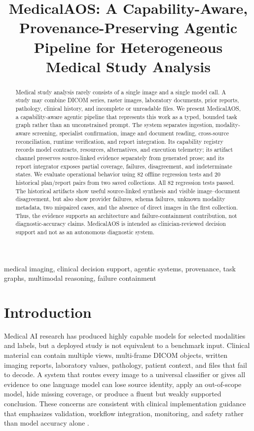 \documentclass[a4paper,conference]{IEEEtran}
\title{MedicalAOS: A Capability-Aware, Provenance-Preserving Agentic Pipeline for Heterogeneous Medical Study Analysis}
\author{\IEEEauthorblockN{\mbox{[Author Name(s)]}}
\IEEEauthorblockA{\mbox{[Department or Laboratory]}\\
\mbox{[Institution]}\\
\mbox{[City, Country]}\\
\texttt{[corresponding.author@institution.edu]}}}
\begin{document}
\maketitle

\begin{strip}
\begin{abstract}
Medical study analysis rarely consists of a single image and a single model call. A study may combine DICOM series, raster images, laboratory documents, prior reports, pathology, clinical history, and incomplete or unreadable files. We present MedicalAOS, a capability-aware agentic pipeline that represents this work as a typed, bounded task graph rather than an unconstrained prompt. The system separates ingestion, modality-aware screening, specialist confirmation, image and document reading, cross-source reconciliation, runtime verification, and report integration. Its capability registry records model contracts, resources, alternatives, and execution telemetry; its artifact channel preserves source-linked evidence separately from generated prose; and its report integrator exposes partial coverage, failures, disagreement, and indeterminate states. We evaluate operational behavior using 82 offline regression tests and 20 historical plan/report pairs from two saved collections. All 82 regression tests passed. The historical artifacts show useful source-linked synthesis and visible image--document disagreement, but also show provider failures, schema failures, unknown modality metadata, two mispaired cases, and the absence of direct images in the first collection. Thus, the evidence supports an architecture and failure-containment contribution, not diagnostic-accuracy claims. MedicalAOS is intended as clinician-reviewed decision support and not as an autonomous diagnostic system.
\end{abstract}
\begin{IEEEkeywords}
medical imaging, clinical decision support, agentic systems, provenance, task graphs, multimodal reasoning, failure containment
\end{IEEEkeywords}
\end{strip}

\section{Introduction}
Medical AI research has produced highly capable models for selected modalities and labels, but a deployed study is not equivalent to a benchmark input. Clinical material can contain multiple views, multi-frame DICOM objects, written imaging reports, laboratory values, pathology, patient context, and files that fail to decode. A system that routes every image to a universal classifier or gives all evidence to one language model can lose source identity, apply an out-of-scope model, hide missing coverage, or produce a fluent but weakly supported conclusion. These concerns are consistent with clinical implementation guidance that emphasizes validation, workflow integration, monitoring, and safety rather than model accuracy alone \cite{recht2020integrating,filice2020products}.
\end{document}
